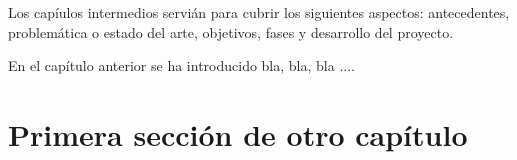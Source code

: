 

Los capíulos intermedios servián para cubrir los siguientes aspectos:
antecedentes, problemática o estado del arte, objetivos, fases y desarrollo del proyecto.

En el capítulo anterior se ha introducido bla, bla, bla ....


\section{Primera sección de otro capítulo}
\label{:sec1}

